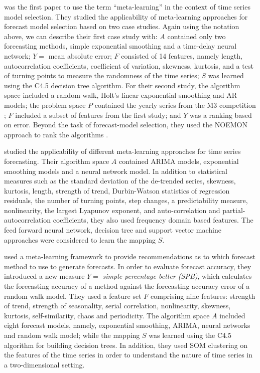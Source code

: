 \documentclass[11pt,a4paper,]{article}
\begin{document}
\textcite{prudencio2004meta} was the first paper to use the term ``meta-learning'' in the context of time series model selection. They studied the applicability of meta-learning approaches for forecast model selection based on two case studies. Again using the notation above, we can describe their first case study with: \(A\) contained only two forecasting methods, simple exponential smoothing and a time-delay neural network; \(Y=\) mean absolute error; \(F\) consisted of 14 features, namely length, autocorrelation coefficients, coefficient of variation, skewness, kurtosis, and a test of turning points to measure the randomness of the time series; \(S\) was learned using the C4.5 decision tree algorithm. For their second study, the algorithm space included a random walk, Holt's linear exponential smoothing and AR models; the problem space \(P\) contained the yearly series from the M3 competition \autocite{makridakis2000m3}; \(F\) included a subset of features from the first study; and \(Y\) was a ranking based on error. Beyond the task of forecast-model selection, they used the NOEMON approach to rank the algorithms \autocite{kalousis1999noemon}.

\textcite{lemke2010meta} studied the applicability of different meta-learning approaches for time series forecasting. Their algorithm space \(A\) contained ARIMA models, exponential smoothing models and a neural network model. In addition to statistical measures such as the standard deviation of the de-trended series, skewness, kurtosis, length, strength of trend, Durbin-Watson statistics of regression residuals, the number of turning points, step changes, a predictability measure, nonlinearity, the largest Lyapunov exponent, and auto-correlation and partial-autocorrelation coefficients, they also used frequency domain based features. The feed forward neural network, decision tree and support vector machine approaches were considered to learn the mapping \(S\).

\textcite{wang2009rule} used a meta-learning framework to provide recommendations as to which forecast method to use to generate forecasts. In order to evaluate forecast accuracy, they introduced a new measure \(Y =\) \emph{simple percentage better (SPB)}, which calculates the forecasting accuracy of a method against the forecasting accuracy error of a random walk model. They used a feature set \(F\) comprising nine features: strength of trend, strength of seasonality, serial correlation, nonlinearity, skewness, kurtosis, self-similarity, chaos and periodicity. The algorithm space \(A\) included eight forecast models, namely, exponential smoothing, ARIMA, neural networks and random walk model; while the mapping \(S\) was learned using the C4.5 algorithm for building decision trees. In addition, they used SOM clustering on the features of the time series in order to understand the nature of time series in a two-dimensional setting.
\end{document}
